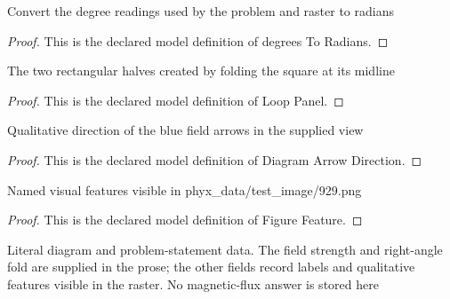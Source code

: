 \begin{definition}
  \label{def:physics:phyx-mini-0929:phyxminiproblems-problemphyxmini0929-degreestoradians}
  Convert the degree readings used by the problem and raster to radians
\end{definition}
\begin{proof}
  This is the declared model definition of degrees To Radians.
\end{proof}
\begin{definition}
  \label{def:physics:phyx-mini-0929:phyxminiproblems-problemphyxmini0929-looppanel}
  The two rectangular halves created by folding the square at its midline
\end{definition}
\begin{proof}
  This is the declared model definition of Loop Panel.
\end{proof}
\begin{definition}
  \label{def:physics:phyx-mini-0929:phyxminiproblems-problemphyxmini0929-diagramarrowdirection}
  Qualitative direction of the blue field arrows in the supplied view
\end{definition}
\begin{proof}
  This is the declared model definition of Diagram Arrow Direction.
\end{proof}
\begin{definition}
  \label{def:physics:phyx-mini-0929:phyxminiproblems-problemphyxmini0929-figurefeature}
  Named visual features visible in phyx\_data/test\_image/929.png
\end{definition}
\begin{proof}
  This is the declared model definition of Figure Feature.
\end{proof}
\begin{definition}
  \label{def:physics:phyx-mini-0929:phyxminiproblems-problemphyxmini0929-bentloopproblemfigure}
  Literal diagram and problem-statement data. The field strength and right-angle fold are supplied in the prose; the other fields record labels and qualitative features visible in the raster. No magnetic-flux answer is stored here
\end{definition}
